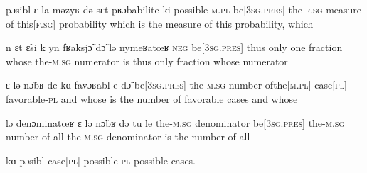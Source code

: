               {{pɔsibl{\liaison}} ɛ la məzyʁ də sɛt pʁɔbabilite ki}
              {possible-\textsc{m}.\textsc{pl} {be[3\textsc{sg}.\textsc{pres}]} the-\textsc{f}.\textsc{sg} measure of {this[\textsc{f}.\textsc{sg}]} probability which}
              { is the measure of this probability, which}

              {n {ɛt{\liaison}} \~{ɛ}si {k{\liaison}} yn fʁaksj\~{ɔ} d\~{ɔ} lə {nymeʁatœʁ\liaison}}
              {\textsc{neg} {be[3\textsc{sg}.\textsc{pres}]} thus only one fraction whose the-\textsc{m}.\textsc{sg} numerator}
              {is thus only   fraction whose  numerator}

              {ɛ lə n\~{ɔ}bʁ de kɑ favɔʁabl e d\~{ɔ}}
              {{be[3\textsc{sg}.\textsc{pres}]} the-\textsc{m}.\textsc{sg} number {of{\textunderscore}the[\textsc{m}.\textsc{pl}]} {case[\textsc{pl}]} favorable-\textsc{pl} and whose}
              {is the number of favorable cases and whose}

              {lə {denɔminatœʁ\liaison} ɛ lə n\~{ɔ}bʁ də tu le}
              {the-\textsc{m}.\textsc{sg} denominator {be[3\textsc{sg}.\textsc{pres}]} the-\textsc{m}.\textsc{sg} number of all the-\textsc{m}.\textsc{sg}}
              { denominator is the number of all }

              {kɑ pɔsibl}
              {case[\textsc{pl}] possible-\textsc{pl}}
              {possible cases.}
